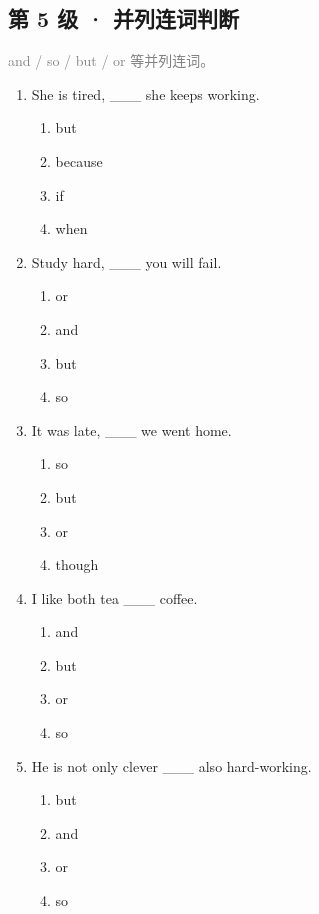 \documentclass[11pt,a4paper]{ctexart}
\begin{document}
\subsection*{第 5 级 · 并列连词判断}
\noindent\textcolor{gray}{and / so / but / or 等并列连词。}\par\smallskip
\begin{enumerate}[leftmargin=*,itemsep=4pt]
\item She is tired, \_\_\_ she keeps working.
\begin{enumerate}[label=\Alph*.,leftmargin=2em,itemsep=1pt,topsep=2pt]
\item but
\item because
\item if
\item when
\end{enumerate}
\item Study hard, \_\_\_ you will fail.
\begin{enumerate}[label=\Alph*.,leftmargin=2em,itemsep=1pt,topsep=2pt]
\item or
\item and
\item but
\item so
\end{enumerate}
\item It was late, \_\_\_ we went home.
\begin{enumerate}[label=\Alph*.,leftmargin=2em,itemsep=1pt,topsep=2pt]
\item so
\item but
\item or
\item though
\end{enumerate}
\item I like both tea \_\_\_ coffee.
\begin{enumerate}[label=\Alph*.,leftmargin=2em,itemsep=1pt,topsep=2pt]
\item and
\item but
\item or
\item so
\end{enumerate}
\item He is not only clever \_\_\_ also hard-working.
\begin{enumerate}[label=\Alph*.,leftmargin=2em,itemsep=1pt,topsep=2pt]
\item but
\item and
\item or
\item so
\end{enumerate}

\end{enumerate}
\end{document}
